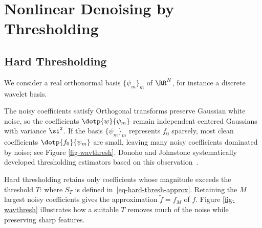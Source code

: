 \section{Nonlinear Denoising by Thresholding}
\label{sec-nl-denoising-thresh}

                                                     
\subsection{Hard Thresholding}
\label{subsec-denoise-hard}

We consider a real orthonormal basis $\{\psi_m\}_m$ of $\RR^N$, for instance a discrete wavelet basis.
 
The noisy coefficients satisfy
Orthogonal transforms preserve Gaussian white noise, so the coefficients $\dotp{w}{\psi_m}$ remain independent centered Gaussians with variance $\si^2$. If the basis $\{\psi_m\}_m$ represents $f_0$ sparsely, most clean coefficients $ \dotp{f_0}{\psi_m}$ are small, leaving many noisy coefficients dominated by noise; see Figure \ref{fig-wavthresh}. Donoho and Johnstone systematically developed thresholding estimators based on this observation~\cite{donoho-shrinkage}.


Hard thresholding retains only coefficients whose magnitude exceeds the threshold $T$:
where $S_T$ is defined in~\eqref{eq-hard-thresh-approx}. Retaining the $M$ largest noisy coefficients gives the approximation $\tilde f = f_M$ of $f$. Figure \ref{fig-wavthresh} illustrates how a suitable $T$ removes much of the noise while preserving sharp features.

                                                                                                             

                                      
                                                                                                                                                                              

